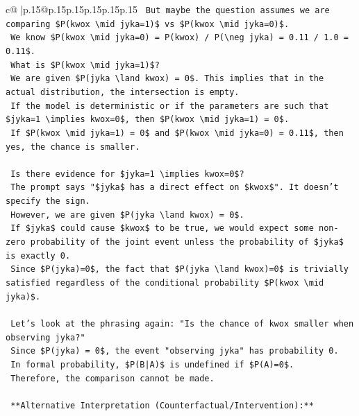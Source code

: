 \documentclass{article}
\begin{document}
{\begin{supertabular}{c@{$\;$}|p{.15\linewidth}@{}p{.15\linewidth}p{.15\linewidth}p{.15\linewidth}p{.15\linewidth}p{.15\linewidth}}
{{{\texttt{        But maybe the question assumes we are comparing \$P(kwox \textbackslash{}mid jyka=1)\$ vs \$P(kwox \textbackslash{}mid jyka=0)\$.} \\
\texttt{        We know \$P(kwox \textbackslash{}mid jyka=0) = P(kwox) / P(\textbackslash{}neg jyka) = 0.11 / 1.0 = 0.11\$.} \\
\texttt{        What is \$P(kwox \textbackslash{}mid jyka=1)\$?} \\
\texttt{        We are given \$P(jyka \textbackslash{}land kwox) = 0\$. This implies that in the actual distribution, the intersection is empty.} \\
\texttt{        If the model is deterministic or if the parameters are such that \$jyka=1 \textbackslash{}implies kwox=0\$, then \$P(kwox \textbackslash{}mid jyka=1) = 0\$.} \\
\texttt{        If \$P(kwox \textbackslash{}mid jyka=1) = 0\$ and \$P(kwox \textbackslash{}mid jyka=0) = 0.11\$, then yes, the chance is smaller.} \\
\\ 
\texttt{        Is there evidence for \$jyka=1 \textbackslash{}implies kwox=0\$?} \\
\texttt{        The prompt says "\$jyka\$ has a direct effect on \$kwox\$". It doesn't specify the sign.} \\
\texttt{        However, we are given \$P(jyka \textbackslash{}land kwox) = 0\$.} \\
\texttt{        If \$jyka\$ could cause \$kwox\$ to be true, we would expect some non{-}zero probability of the joint event unless the probability of \$jyka\$ is exactly 0.} \\
\texttt{        Since \$P(jyka)=0\$, the fact that \$P(jyka \textbackslash{}land kwox)=0\$ is trivially satisfied regardless of the conditional probability \$P(kwox \textbackslash{}mid jyka)\$.} \\
\\ 
\texttt{        Let's look at the phrasing again: "Is the chance of kwox smaller when observing jyka?"} \\
\texttt{        Since \$P(jyka) = 0\$, the event "observing jyka" has probability 0.} \\
\texttt{        In formal probability, \$P(B|A)\$ is undefined if \$P(A)=0\$.} \\
\texttt{        Therefore, the comparison cannot be made.} \\
\\ 
\texttt{        **Alternative Interpretation (Counterfactual/Intervention):**} \\
}}}
\end{supertabular}}
\end{document}
